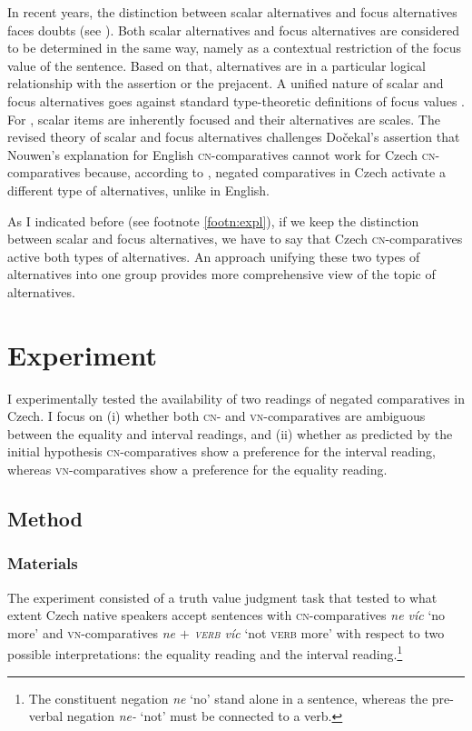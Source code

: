 \documentclass[output=paper,
]{langscibook}
\begin{document}
In recent years, the distinction between scalar alternatives and focus alternatives faces doubts (see \citealt{katzir2007structurally,fox2011characterization,fox2018economy}). Both scalar alternatives and focus alternatives are considered to be determined in the same way, namely as a contextual restriction of the focus value of the sentence. Based on that, alternatives are in a particular logical relationship with the assertion or the prejacent. A unified nature of scalar and focus alternatives goes against standard type-theoretic definitions of focus values \citep{fox2011characterization}. For \citet{krifka1995semantics}, scalar items are inherently focused and their alternatives are scales. The revised theory of scalar and focus alternatives challenges Dočekal's assertion that Nouwen's explanation for English \textsc{cn-}comparatives cannot work for Czech \textsc{cn-}comparatives because, according to \citet{dovcekal2017upper}, negated comparatives in Czech activate a different type of alternatives, unlike in English. 

As I indicated before (see footnote \ref{footn:expl}), if we keep the distinction between scalar and focus alternatives, we have to say that Czech \textsc{cn-}comparatives active both types of alternatives. An approach unifying these two types of alternatives into one group provides more comprehensive view of the topic of alternatives.


\section{Experiment}

I experimentally tested the availability of two readings of negated comparatives in Czech. I focus on (i) whether both \textsc{cn-} and \textsc{vn-}comparatives are ambiguous between the equality and interval readings, and (ii) whether as predicted by the initial hypothesis \textsc{cn-}comparatives show a preference for the interval reading, whereas \textsc{vn-}comparatives show a preference for the equality reading. 

\subsection{Method}

\subsubsection{Materials}

The experiment consisted of a truth value judgment task that tested to what extent Czech native speakers accept sentences with \textsc{cn-}comparatives \textit{ne víc} `no more' and \textsc{vn-}comparatives \textit{ne $+$ \textsc{verb} víc} `not \textsc{verb} more' with respect to two possible interpretations: the equality reading and the interval reading.\footnote{The constituent negation \textit{ne} `no' stand alone in a sentence, whereas the pre-verbal negation \textit{ne-} `not' must be connected to a verb.}
\end{document}

